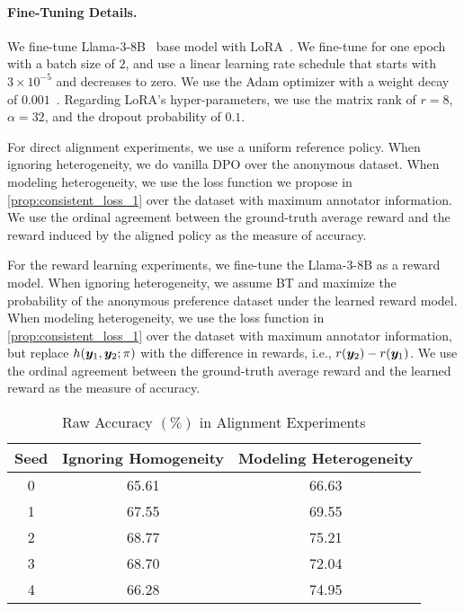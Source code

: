 \paragraph{Fine-Tuning Details.}
We fine-tune Llama-3-8B~\citep{llama3modelcard} base model with LoRA~\citep{lora}.
We fine-tune for one epoch with a batch size of $2$, and use a linear learning rate schedule that starts with $3\times10^{-5}$ and decreases to zero.
We use the Adam optimizer with a weight decay of $0.001$~\citep{adamw}.
Regarding LoRA's hyper-parameters, we use the matrix rank of $r=8$, $\alpha=32$, and the dropout probability of $0.1$.

For direct alignment experiments, we use a uniform reference policy.
When ignoring heterogeneity, we do vanilla DPO over the anonymous dataset.
When modeling heterogeneity, we use the loss function we propose in \cref{prop:consistent_loss_1} over the dataset with maximum annotator information.
We use the ordinal agreement between the ground-truth average reward and the reward induced by the aligned policy as the measure of accuracy.

For the reward learning experiments, we fine-tune the Llama-3-8B as a reward model.
When ignoring heterogeneity, we assume BT and maximize the probability of the anonymous preference dataset under the learned reward model.
When modeling heterogeneity, we use the loss function in \cref{prop:consistent_loss_1} over the dataset with maximum annotator information, but replace $h({\bm{y}}_1, {\bm{y}}_2; \pi)$ with the difference in rewards, i.e., $r({\bm{y}}_2) - r({\bm{y}}_1)$.
We use the ordinal agreement between the ground-truth average reward and the learned reward as the measure of accuracy.

\begin{table}
\caption{Raw Accuracy $(\%)$ in Alignment Experiments}
\label{tab:raw-aligns}
\begin{center}
\begin{small}
\begin{sc}
\begin{tabular}{ccc}
\toprule
Seed & Ignoring Homogeneity & Modeling Heterogeneity \\
\midrule
0    &  65.61 & 66.63\\
1    &  67.55 & 69.55\\
2    &  68.77 & 75.21\\
3    &  68.70 & 72.04\\
4    &  66.28 & 74.95\\
\bottomrule
\end{tabular}
\end{sc}
\end{small}
\end{center}
\end{table}


